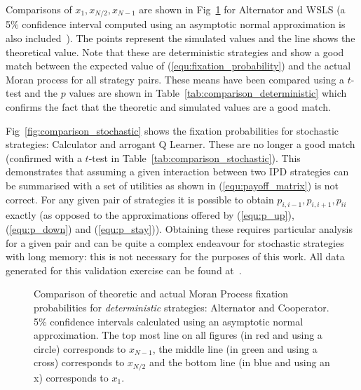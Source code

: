 \documentclass[10pt,letterpaper]{article}
\begin{document}
Comparisons of \(x_1, x_{N/2}, x_{N-1}\) are shown in
Fig~\ref{fig:comparison_deterministic} for Alternator and WSLS (a 5\%
confidence interval computed using an asymptotic normal approximation is also
included~\cite{brown2001interval}).
The points represent the simulated
values and the line shows the theoretical value. Note that these are
deterministic strategies and show a good match between the expected value
of (\ref{equ:fixation_probability}) and the actual Moran process for all
strategy pairs. These means have been compared using a \(t\)-test and the \(p\)
values are shown in Table~\ref{tab:comparison_deterministic} which confirms the
fact that the theoretic and simulated values are a good match.

Fig~\ref{fig:comparison_stochastic} shows the fixation probabilities for
stochastic strategies: Calculator and arrogant Q Learner. These are no longer a
good match (confirmed with a \(t\)-test in
Table~\ref{tab:comparison_stochastic}). This demonstrates that assuming
a given interaction between two IPD strategies can be summarised with a set of
utilities as shown in (\ref{equ:payoff_matrix}) is not correct. For any given pair of
strategies it is possible to obtain \(p_{i,i-1}, p_{i,i+1}, p_{ii}\) exactly (as
opposed to the approximations offered by (\ref{equ:p_up}), (\ref{equ:p_down})
and (\ref{equ:p_stay})). Obtaining these requires particular analysis for a
given pair and can be quite a complex endeavour for stochastic strategies with
long memory: this is not necessary for the purposes of this work. All data
generated for this validation exercise can be found at~\cite{data}.

\begin{figure}[!hbtp]
    \centering
    \caption{Comparison of theoretic and actual Moran Process fixation
             probabilities for \textit{deterministic} strategies: Alternator and
         Cooperator. 5\% confidence intervals calculated using an asymptotic
     normal approximation.
The top most line on all figures (in red and using a circle) corresponds to
\(x_{N-1}\), the middle line (in green and using a cross) corresponds to
\(x_{N/2}\) and the bottom line (in blue and using an x) corresponds to
\(x_{1}\).}
    \label{fig:comparison_deterministic}
\end{figure}
\end{document}
